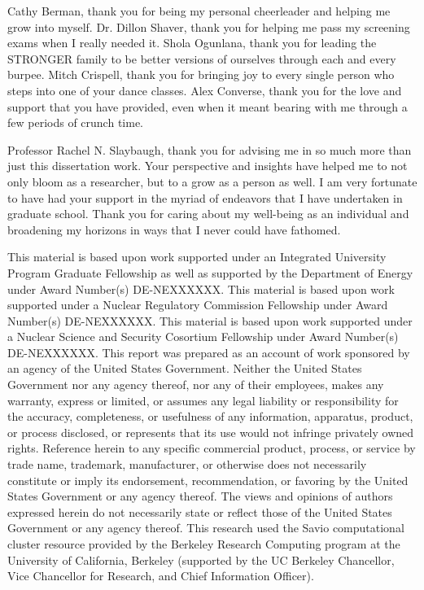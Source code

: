 \documentclass{ucbthesis}
\begin{document}
\begin{frontmatter}
\begin{acknowledgements}
Cathy Berman, thank you for being my personal cheerleader and helping me
grow into myself. Dr. Dillon Shaver, thank you for helping me pass my
screening exams when I really needed it.
Shola Ogunlana, thank you for leading the STRONGER family
to be better versions of ourselves through each and every burpee. Mitch
Crispell, thank you for bringing joy to every single person who steps into
one of your dance classes. Alex Converse, thank you for the love and support
that you have provided, even when it meant bearing with me through a few
periods of crunch time.

Professor Rachel N. Slaybaugh, thank you for advising me in so much more
than just this dissertation work. Your perspective and insights have helped
me to not only bloom as a researcher, but to a grow as a person as well. I
am very fortunate to have had your support in the myriad of endeavors that
I have undertaken in graduate school. Thank you for caring about my well-being
as an individual and broadening my horizons in ways that I never could have
fathomed.

\vspace{\fill}

\scriptsize{This material is based upon work supported under an Integrated
University Program Graduate Fellowship as well as supported by the Department 
of Energy under Award Number(s) DE-NEXXXXXX. 
This material is based upon work supported under a Nuclear Regulatory 
Commission Fellowship under Award Number(s) DE-NEXXXXXX. 
This material is based upon work supported under a Nuclear Science and Security 
Cosortium Fellowship under Award Number(s) DE-NEXXXXXX. 
This report was prepared as an account  of work sponsored by an agency of the 
United States Government. Neither the United 
States Government nor any agency thereof, nor any of their employees, makes any 
warranty, express or limited, or assumes any legal liability or responsibility for the 
accuracy, completeness, or usefulness of any information, apparatus, product, or
process disclosed, or represents that its use would not infringe privately owned
rights. Reference herein to any specific commercial product, process, or service by
trade name, trademark, manufacturer, or otherwise does not necessarily constitute or
imply its endorsement, recommendation, or favoring by the United States Government or
any agency thereof. The views and opinions of authors expressed herein do not 
necessarily state or reflect those of the United States Government or any agency 
thereof. This research used the Savio computational cluster resource provided by the 
Berkeley Research Computing program at the University of California, Berkeley 
(supported by the UC Berkeley Chancellor, Vice Chancellor for Research, and Chief 
Information Officer).}

\end{acknowledgements}

\end{frontmatter}
\end{document}

